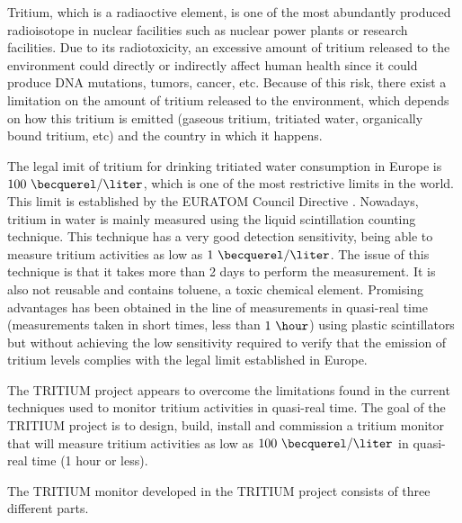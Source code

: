 Tritium, which is a radiaoctive element, is one of the most abundantly produced radioisotope in nuclear facilities such as nuclear power plants or research facilities. Due to its radiotoxicity, an excessive amount of tritium released to the environment could directly or indirectly affect human health since it could produce DNA mutations, tumors, cancer, etc. Because of this risk, there exist a limitation on the amount of tritium released to the environment, which depends on how this tritium is emitted (gaseous tritium, tritiated water, organically bound tritium, etc) and the country in which it happens.

The legal imit of tritium for drinking tritiated water consumption in Europe is $100~\becquerel/\liter$, which is one of the most restrictive limits in the world. This limit is established by the EURATOM Council Directive \cite{EURATOM_GL}. Nowadays, tritium in water is mainly measured using the liquid scintillation counting technique. This technique has a very good detection sensitivity, being able to measure tritium activities as low as $1~\becquerel/\liter$. The issue of this technique is that it takes more than 2 days to perform the measurement. It is also not reusable and contains toluene, a toxic chemical element. Promising advantages has been obtained in the line of measurements in quasi-real time (measurements taken in short times, less than $1~\hour$) using plastic scintillators but without achieving the low sensitivity required to verify that the emission of tritium levels complies with the legal limit established in Europe.

The TRITIUM project appears to overcome the limitations found in the current techniques used to monitor tritium activities in quasi-real time. The goal of the TRITIUM project is to design, build, install and commission a tritium monitor that will measure tritium activities as low as $100~\becquerel/\liter$  in quasi-real time (1 hour or less).

The TRITIUM monitor developed in the TRITIUM project consists of three different parts.

